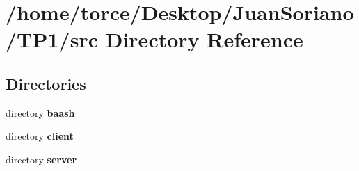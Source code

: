 \section{/home/torce/\+Desktop/\+Juan\+Soriano/\+T\+P1/src Directory Reference}
\label{dir_18a4d8b064e4d373b165a75fe8893ab3}
\subsection*{Directories}
\begin{DoxyCompactItemize}
\item 
directory {\bf baash}
\item 
directory {\bf client}
\item 
directory {\bf server}
\end{DoxyCompactItemize}
